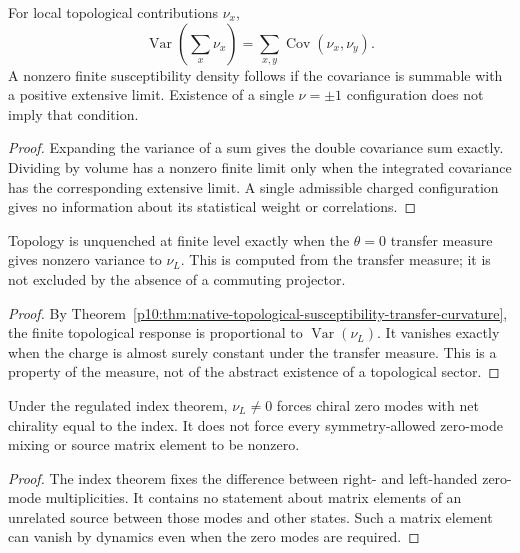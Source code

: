 \documentclass[12pt,a4paper]{article}
\begin{document}
\begin{theorem}
\label{p10:thm:primitive-topological-cell-extensivity}
For local topological contributions \(\nu_x\),
\begin{equation}
\operatorname{Var}\!\left(\sum_x\nu_x\right)=\sum_{x,y}\operatorname{Cov}(\nu_x,\nu_y).
\end{equation}
A nonzero finite susceptibility density follows if the covariance is summable with a positive extensive limit.  Existence of a single \(\nu=\pm1\) configuration does not imply that condition.
\end{theorem}
\begin{proof}
Expanding the variance of a sum gives the double covariance sum exactly.  Dividing by volume has a nonzero finite limit only when the integrated covariance has the corresponding extensive limit.  A single admissible charged configuration gives no information about its statistical weight or correlations.
\end{proof}

\begin{theorem}
\label{p10:thm:no-topological-quench}
Topology is unquenched at finite level exactly when the \(\theta=0\) transfer measure gives nonzero variance to \(\nu_L\).  This is computed from the transfer measure; it is not excluded by the absence of a commuting projector.
\end{theorem}
\begin{proof}
By Theorem~\ref{p10:thm:native-topological-susceptibility-transfer-curvature}, the finite topological response is proportional to $\operatorname{Var}(\nu_L)$.  It vanishes exactly when the charge is almost surely constant under the transfer measure.  This is a property of the measure, not of the abstract existence of a topological sector.
\end{proof}

\begin{theorem}
\label{p10:thm:no-zero-mode-decoupling}
Under the regulated index theorem, \(\nu_L\ne0\) forces chiral zero modes with net chirality equal to the index.  It does not force every symmetry-allowed zero-mode mixing or source matrix element to be nonzero.
\end{theorem}
\begin{proof}
The index theorem fixes the difference between right- and left-handed zero-mode multiplicities.  It contains no statement about matrix elements of an unrelated source between those modes and other states.  Such a matrix element can vanish by dynamics even when the zero modes are required.
\end{proof}
\end{document}
